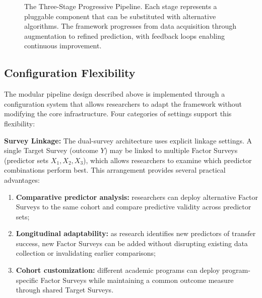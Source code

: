 \documentclass[letterpaper,11pt]{article}
\begin{document}
\begin{figure}[htbp]
{
}%
\caption{The Three-Stage Progressive Pipeline. Each stage represents a pluggable component that can be substituted with alternative algorithms. The framework progresses from data acquisition through augmentation to refined prediction, with feedback loops enabling continuous improvement.}
\label{fig:pipeline}
\end{figure}

\subsection{Configuration Flexibility}\label{subsec:config}

The modular pipeline design described above is implemented through a configuration system that allows researchers to adapt the framework without modifying the core infrastructure. Four categories of settings support this flexibility:

\textbf{Survey Linkage:} The dual-survey architecture uses explicit linkage settings. A single Target Survey (outcome $Y$) may be linked to multiple Factor Surveys (predictor sets $X_1, X_2, X_3$), which allows researchers to examine which predictor combinations perform best. This arrangement provides several practical advantages:

\begin{enumerate}
    \item \textbf{Comparative predictor analysis:} researchers can deploy alternative Factor Surveys to the same cohort and compare predictive validity across predictor sets;
    \item \textbf{Longitudinal adaptability:} as research identifies new predictors of transfer success, new Factor Surveys can be added without disrupting existing data collection or invalidating earlier comparisons;
    \item \textbf{Cohort customization:} different academic programs can deploy program-specific Factor Surveys while maintaining a common outcome measure through shared Target Surveys.
\end{enumerate}
\end{document}

